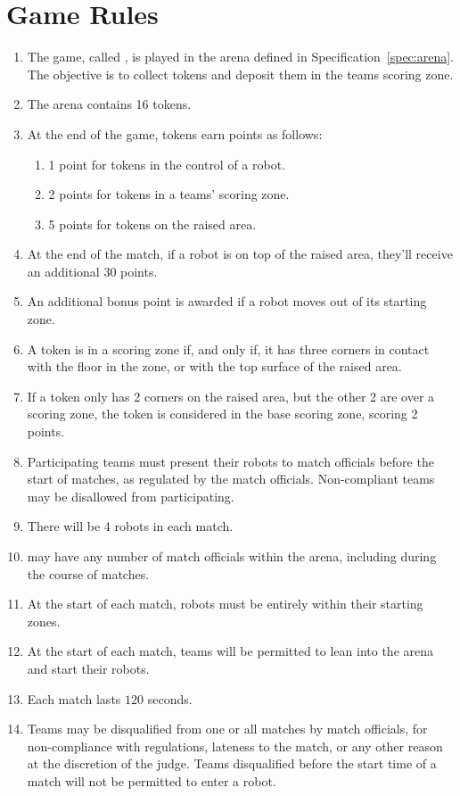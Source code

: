 \section{Game Rules}
\label{sec:rules}

\begin{enumerate}
  \item The game, called \emph{\gamename}, is played in the arena defined in
        Specification~\ref{spec:arena}. The objective is to collect tokens and
        deposit them in the teams scoring zone.
  \item The arena contains 16 tokens.
  \item At the end of the game, tokens earn points as follows:
    \begin{enumerate}
      \item 1 point for tokens in the control of a robot.
      \item 2 points for tokens in a teams' scoring zone.
      \item 5 points for tokens on the raised area.
    \end{enumerate}
  \item At the end of the match, if a robot is on top of the raised area, they'll
        receive an additional 30 points.
  \item An additional bonus point is awarded if a robot moves out of its starting
        zone.
  \item A token is in a scoring zone if, and only if, it has three corners in contact
        with the floor in the zone, or with the top surface of the raised area.
  \item If a token only has 2 corners on the raised area, but the other 2 are over
        a scoring zone, the token is considered in the base scoring zone, scoring 2 points.
  \item Participating teams must present their robots to match officials before
        the start of matches, as regulated by the match officials. Non-compliant
        teams may be disallowed from participating.
  \item There will be 4 robots in each match.
  \item \org may have any number of match officials within the arena, including
        during the course of matches.
  \item At the start of each match, robots must be entirely within their
        starting zones.
  \item At the start of each match, teams will be permitted to lean into the
        arena and start their robots.
  \item Each match lasts $120$ seconds.
  \item Teams may be disqualified from one or all matches by match officials,
        for non-compliance with regulations, lateness to the match, or any other
        reason at the discretion of the judge. Teams disqualified before the
        start time of a match will not be permitted to enter a robot.
\end{enumerate}
